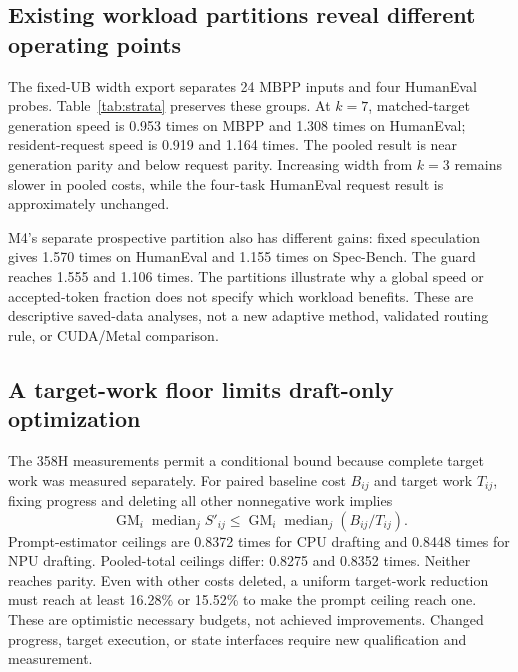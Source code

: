 \subsection{Existing workload partitions reveal different operating points}
The fixed-UB width export separates 24 MBPP inputs and four HumanEval probes. Table~\ref{tab:strata} preserves these groups. At $k=7$, matched-target generation speed is 0.953 times on MBPP and 1.308 times on HumanEval; resident-request speed is 0.919 and 1.164 times. The pooled result is near generation parity and below request parity. Increasing width from $k=3$ remains slower in pooled costs, while the four-task HumanEval request result is approximately unchanged.

M4's separate prospective partition also has different gains: fixed speculation gives 1.570 times on HumanEval and 1.155 times on Spec-Bench. The guard reaches 1.555 and 1.106 times. The partitions illustrate why a global speed or accepted-token fraction does not specify which workload benefits. These are descriptive saved-data analyses, not a new adaptive method, validated routing rule, or CUDA/Metal comparison.


\subsection{A target-work floor limits draft-only optimization}
The 358H measurements permit a conditional bound because complete target work was measured separately. For paired baseline cost $B_{ij}$ and target work $T_{ij}$, fixing progress and deleting all other nonnegative work implies
\begin{equation}
\operatorname{GM}_i\operatorname{median}_j S'_{ij}
\leq\operatorname{GM}_i\operatorname{median}_j(B_{ij}/T_{ij}).
\end{equation}
Prompt-estimator ceilings are 0.8372 times for CPU drafting and 0.8448 times for NPU drafting. Pooled-total ceilings differ: 0.8275 and 0.8352 times. Neither reaches parity. Even with other costs deleted, a uniform target-work reduction must reach at least 16.28\% or 15.52\% to make the prompt ceiling reach one. These are optimistic necessary budgets, not achieved improvements. Changed progress, target execution, or state interfaces require new qualification and measurement.
